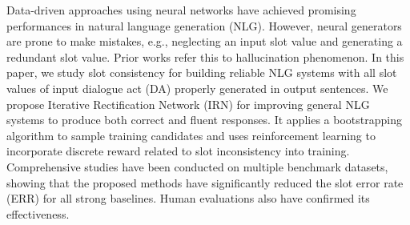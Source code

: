 Data-driven approaches using neural networks have achieved promising performances in natural language generation (NLG). However, neural generators are prone to make mistakes, e.g., neglecting an input slot value and generating a redundant slot value. Prior works refer this to hallucination phenomenon. In this paper, we study slot consistency for building reliable NLG systems with all slot values of input dialogue act (DA) properly generated in output sentences. We propose Iterative Rectification Network (IRN) for improving general NLG systems to produce both correct and fluent responses. It applies a bootstrapping algorithm to sample training candidates and uses reinforcement learning to incorporate discrete reward related to slot inconsistency into training. Comprehensive studies have been conducted on multiple benchmark datasets, showing that the proposed methods have significantly reduced the slot error rate (ERR) for all strong baselines. Human evaluations also have confirmed its effectiveness.
